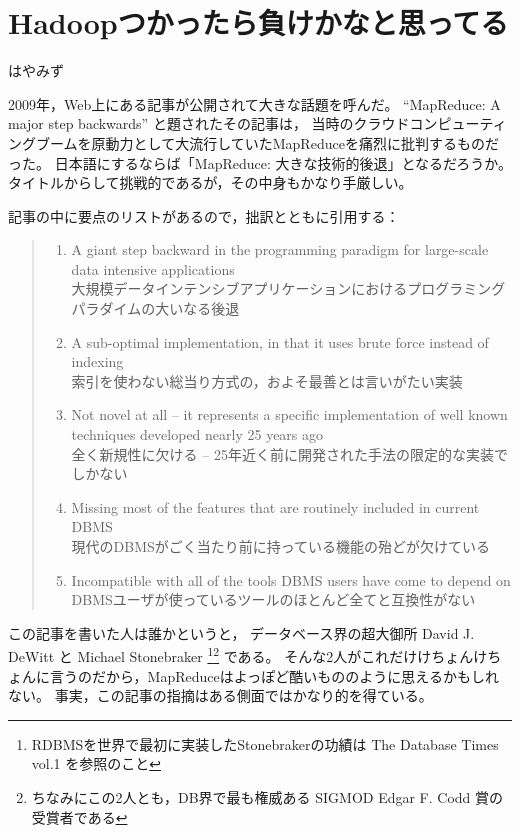 
\chapter{Hadoopつかったら負けかなと思ってる}

\begin{flushright}
はやみず
\end{flushright}

2009年，Web上にある記事が公開されて大きな話題を呼んだ。
``MapReduce: A major step backwards'' と題されたその記事は，
当時のクラウドコンピューティングブームを原動力として大流行していたMapReduceを痛烈に批判するものだった。
日本語にするならば「MapReduce: 大きな技術的後退」となるだろうか。
タイトルからして挑戦的であるが，その中身もかなり手厳しい。

記事の中に要点のリストがあるので，拙訳とともに引用する：

\begin{quote}
\begin{enumerate}
 \item A giant step backward in the programming paradigm for large-scale data intensive applications \\
	   大規模データインテンシブアプリケーションにおけるプログラミングパラダイムの大いなる後退
 \item A sub-optimal implementation, in that it uses brute force instead of indexing \\
	   索引を使わない総当り方式の，およそ最善とは言いがたい実装
 \item Not novel at all -- it represents a specific implementation of well known techniques developed nearly 25 years ago \\
	   全く新規性に欠ける -- 25年近く前に開発された手法の限定的な実装でしかない
 \item Missing most of the features that are routinely included in current DBMS \\
	   現代のDBMSがごく当たり前に持っている機能の殆どが欠けている
 \item Incompatible with all of the tools DBMS users have come to depend on \\
	   DBMSユーザが使っているツールのほとんど全てと互換性がない
\end{enumerate}
\end{quote}

この記事を書いた人は誰かというと，
データベース界の超大御所 David J. DeWitt と Michael Stonebraker \footnote{RDBMSを世界で最初に実装したStonebrakerの功績は The Database Times vol.1 を参照のこと}\footnote{ちなみにこの2人とも，DB界で最も権威ある SIGMOD Edgar F. Codd 賞の受賞者である} である。
そんな2人がこれだけけちょんけちょんに言うのだから，MapReduceはよっぽど酷いもののように思えるかもしれない。
事実，この記事の指摘はある側面ではかなり的を得ている。

